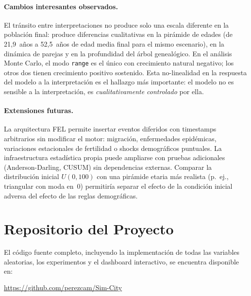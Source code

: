 \documentclass{llncs}
\begin{document}
\paragraph{Cambios interesantes observados.}
El tránsito entre interpretaciones no produce solo una escala diferente en
la población final: produce diferencias cualitativas en la pirámide de
edades (de 21{,}9~años a 52{,}5~años de edad media final para el mismo
escenario), en la dinámica de parejas y en la profundidad del árbol
genealógico.
En el análisis Monte Carlo, el modo \texttt{range} es el único con
crecimiento natural negativo; los otros dos tienen crecimiento positivo
sostenido.
Esta no-linealidad en la respuesta del modelo a la interpretación es el
hallazgo más importante: el modelo no es sensible a la interpretación,
es \emph{cualitativamente controlado} por ella.

\paragraph{Extensiones futuras.}
La arquitectura FEL permite insertar eventos diferidos con timestamps
arbitrarios sin modificar el motor: migración, enfermedades epidémicas,
variaciones estacionales de fertilidad o shocks demográficos puntuales.
La infraestructura estadística propia puede ampliarse con pruebas adicionales
(Anderson-Darling, CUSUM) sin dependencias externas.
Comparar la distribución inicial $U(0,100)$ con una pirámide etaria más
realista (p.~ej., triangular con moda en~0) permitiría separar el efecto de
la condición inicial adversa del efecto de las reglas demográficas.

\section*{Repositorio del Proyecto}

El código fuente completo, incluyendo la implementación de todas las
variables aleatorias, los experimentos y el dashboard interactivo, se
encuentra disponible en:

\begin{center}
  \url{https://github.com/perezcam/Sim-City}
\end{center}
\end{document}
